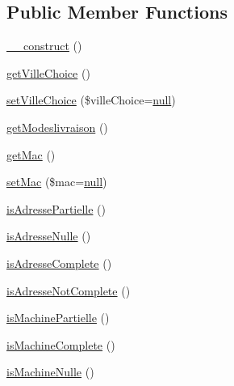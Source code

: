 \subsection*{Public Member Functions}
\begin{DoxyCompactItemize}
\item 
\hyperlink{class_acme_group_1_1_user_bundle_1_1_entity_1_1_user_ad584a22ea231550aa72d28b5edd1c421}{\+\_\+\+\_\+construct} ()
\item 
\hyperlink{class_acme_group_1_1_user_bundle_1_1_entity_1_1_user_a284aa01a97a20e1bc642af556c4a7a5a}{get\+Ville\+Choice} ()
\item 
\hyperlink{class_acme_group_1_1_user_bundle_1_1_entity_1_1_user_ae3da40aeff855ec8fb4b8be52f4363b1}{set\+Ville\+Choice} (\$ville\+Choice=\hyperlink{validate_8js_afb8e110345c45e74478894341ab6b28e}{null})
\item 
\hyperlink{class_acme_group_1_1_user_bundle_1_1_entity_1_1_user_a5788ab9c82be3f6fd33b76f58cddade5}{get\+Modeslivraison} ()
\item 
\hyperlink{class_acme_group_1_1_user_bundle_1_1_entity_1_1_user_abbda10d65e515e1cfc7d21af35791ba6}{get\+Mac} ()
\item 
\hyperlink{class_acme_group_1_1_user_bundle_1_1_entity_1_1_user_a77b1220dcc9bedec5deddb8aff1c6eb2}{set\+Mac} (\$mac=\hyperlink{validate_8js_afb8e110345c45e74478894341ab6b28e}{null})
\item 
\hyperlink{class_acme_group_1_1_user_bundle_1_1_entity_1_1_user_afb63504013b2c1ccd3397c28050d1f87}{is\+Adresse\+Partielle} ()
\item 
\hyperlink{class_acme_group_1_1_user_bundle_1_1_entity_1_1_user_a30e4b6091e7ee7504b2f63efa784d2ba}{is\+Adresse\+Nulle} ()
\item 
\hyperlink{class_acme_group_1_1_user_bundle_1_1_entity_1_1_user_a8c7c9e1adbe84ac442beb28a3672c485}{is\+Adresse\+Complete} ()
\item 
\hyperlink{class_acme_group_1_1_user_bundle_1_1_entity_1_1_user_af6566e3f8cd259daaf58645549718e02}{is\+Adresse\+Not\+Complete} ()
\item 
\hyperlink{class_acme_group_1_1_user_bundle_1_1_entity_1_1_user_aca68780b5c1795b69e6b489805959214}{is\+Machine\+Partielle} ()
\item 
\hyperlink{class_acme_group_1_1_user_bundle_1_1_entity_1_1_user_ab9e0dcd4859e08b3af00781df86fc18a}{is\+Machine\+Complete} ()
\item 
\hyperlink{class_acme_group_1_1_user_bundle_1_1_entity_1_1_user_a2e7d96eba73d0238e6c72838f822415f}{is\+Machine\+Nulle} ()

\end{DoxyCompactItemize}
